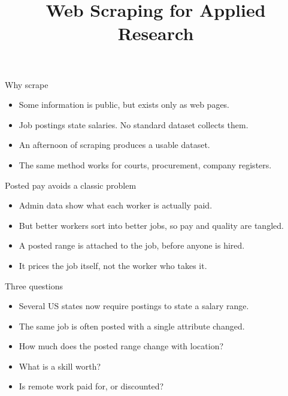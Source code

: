 \documentclass[11pt,aspectratio=169]{beamer}
\title{Web Scraping for Applied Research}
\date{}
\author{}
\newenvironment{wideitemize}
  {\begin{itemize}\setlength{\itemsep}{10pt}}
  {\end{itemize}}
\begin{document}
\titleslide

\begin{frame}{Why scrape}
\begin{wideitemize}
  \item Some information is public, but exists only as web pages.
  \item Job postings state salaries. No standard dataset collects them.
  \item An afternoon of scraping produces a usable dataset.
  \item The same method works for courts, procurement, company registers.
\end{wideitemize}
\end{frame}

\begin{frame}{Posted pay avoids a classic problem}
\begin{wideitemize}
  \item Admin data show what each worker is actually paid.
  \item But better workers sort into better jobs, so pay and quality are tangled.
  \item A posted range is attached to the job, before anyone is hired.
  \item It prices the job itself, not the worker who takes it.
\end{wideitemize}
\end{frame}

\begin{frame}{Three questions}
\begin{wideitemize}
  \item Several US states now require postings to state a salary range.
  \item The same job is often posted with a single attribute changed.
  \item How much does the posted range change with location?
  \item What is a skill worth?
  \item Is remote work paid for, or discounted?
\end{wideitemize}
\end{frame}

\end{document}
